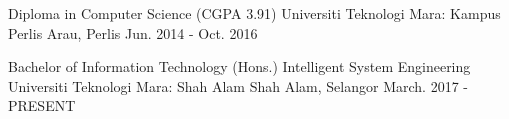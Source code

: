 

\begin{cventries}


  \cventry
    {Diploma in Computer Science (CGPA 3.91)}
    {Universiti Teknologi Mara: Kampus Perlis}
    {Arau, Perlis}
    {Jun. 2014 - Oct. 2016}
    {}

   \cventry
    {Bachelor of Information Technology (Hons.) Intelligent System Engineering}
    {Universiti Teknologi Mara: Shah Alam}
    {Shah Alam, Selangor}
    {March. 2017 - PRESENT}
    {}

\end{cventries}
